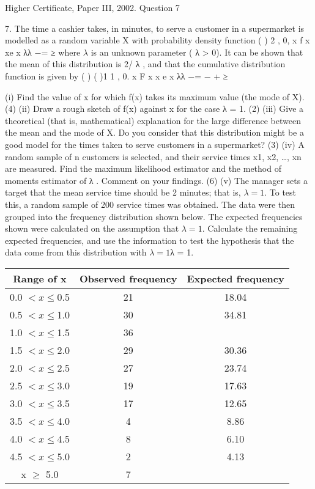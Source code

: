 \documentclass[a4paper,12pt]{article}
\begin{document}
Higher Certificate, Paper III, 2002. Question 7

\begin{framed}
7. The time a cashier takes, in minutes, to serve a customer in a supermarket is modelled as a random variable X with probability density function 
  ( ) 2 , 0, x f x xe x λλ −= ≥ 
 where $\lambda$ is an unknown parameter ( λ > 0).  It can be shown that the mean of this distribution is 2/ λ , and that the cumulative 
distribution function is given by  ( ) ( )1 1 , 0. x F x x e x λλ −= − + ≥ 
 
(i) Find the value of x for which f(x) takes its maximum value (the mode of X). (4) 
 (ii) Draw a rough sketch of f(x) against x for the case λ = 1. (2) 
 (iii) Give a theoretical (that is, mathematical) explanation for the large difference between the mean and the mode of X.  
Do you consider that this distribution might be a good model for the times taken to serve customers in a supermarket? (3) 
 (iv) A random sample of n customers is selected, and their service times x1, x2, …, xn are measured.  
Find the maximum likelihood estimator and the method of moments estimator of λ .  
Comment on your findings. (6) 
 (v) The manager sets a target that the mean service time should be 2 minutes;  that is, $\lambda = 1$.  
To test this, a random sample of 200 service times was obtained.  
The data were then grouped into the frequency distribution shown below.  
The expected frequencies shown were calculated on the assumption that $\lambda = 1$.  
Calculate the remaining expected frequencies, and use the information to test the hypothesis that 
the data come from this distribution with $\lambda = 1$λ = 1. 

\begin{center}
\begin{tabular}{|c|c|c|} 
Range of x & Observed frequency & Expected frequency \\ \hline
0.0 $< x \leq $0.5 & 21 & 18.04 \\ \hline
0.5 $< x \leq $1.0 & 30 & 34.81 \\ \hline 
1.0 $< x \leq $1.5 & 36 &       \\ \hline
1.5 $< x \leq $2.0 & 29 & 30.36 \\ \hline
2.0 $< x \leq $2.5 & 27 & 23.74 \\ \hline
2.5 $< x \leq $3.0 & 19 & 17.63 \\ \hline
3.0 $< x \leq $3.5 & 17 & 12.65 \\ \hline
3.5 $< x \leq $4.0 &  4 &  8.86 \\ \hline
4.0 $< x \leq $4.5 &  8 &  6.10 \\ \hline
4.5 $< x \leq $5.0 &  2 &  4.13 \\ \hline
x $\geq $ 5.0  &  7  & \\ \hline
\end{tabular}
\end{center}
\end{framed}
\end{document}
